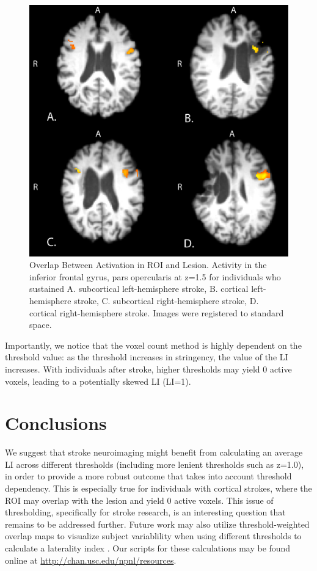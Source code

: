 \documentclass[twocolumn]{bmcart}%
\begin{document}
\begin{figure}[h!]
  \includegraphics[width=.47\textwidth]{activation_standardSpace.jpg}
  \caption{\label{fig2}
  Overlap Between Activation in ROI and Lesion. Activity in the inferior frontal gyrus, pars opercularis at z=1.5 for individuals who sustained A. subcortical left-hemisphere stroke, B. cortical left-hemisphere stroke, C. subcortical right-hemisphere stroke, D. cortical right-hemisphere stroke. Images were registered to standard space. }
\end{figure}

Importantly, we notice that the voxel count method is highly dependent
on the threshold value: as the threshold increases in stringency, the
value of the LI increases. With individuals after stroke, higher
thresholds may yield 0 active voxels, leading to a potentially skewed LI
(LI=1).

\section{Conclusions}\label{conclusions}

We suggest that stroke neuroimaging might benefit from calculating an
average LI across different thresholds (including more lenient
thresholds such as z=1.0), in order to provide a more robust outcome
that takes into account threshold dependency. This is especially true
for individuals with cortical strokes, where the ROI may overlap with
the lesion and yield 0 active voxels. This issue of thresholding,
specifically for stroke research, is an interesting question that
remains to be addressed further. Future work may also utilize
threshold-weighted overlap maps to visualize subject variablility when
using different thresholds to calculate a laterality index
\cite{Seghier2016}. Our scripts for these calculations may be found
online at \url{http://chan.usc.edu/npnl/resources}.

\end{document}
